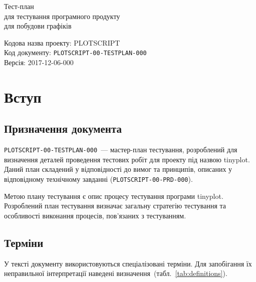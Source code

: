 \documentclass[a4paper,oneside,DIV=12,12pt]{scrartcl}
\newcommand{\progname}{tinyplot}
\newcommand{\theprojcode}{PLOTSCRIPT}
\newcommand{\theprojrev}{00}
\newcommand{\thedoctype}{TESTPLAN}
\newcommand{\thedocnum}{000}
\newcommand{\thedocfullcode}{\theprojcode-\theprojrev-\thedoctype-\thedocnum}
\newcommand{\printdocfullcode}{\texttt{\thedocfullcode}}
\newcommand{\theversion}{2017-12-06-000}
\newcommand{\theprdcode}{PLOTSCRIPT-00-PRD-000}
\newcommand{\printprdcode}{\texttt{\theprdcode}}
\begin{document}
	\begin{titlepage}
	\begin{center}
		\vspace*{\fill}
			Тест-план\\
			для тестування програмного продукту\\
			для побудови графіків
			
		\vspace*{\fill}
	\end{center}
	Кодова назва проекту: \theprojcode\\
	Код документу: \printdocfullcode\\
	Версія: \theversion\\
	\end{titlepage}
	
	\tableofcontents
	\newpage
	
	\section{Вступ}
	
		\subsection{Призначення документа}
			\printdocfullcode{~}— мастер-план тестування, розроблений для визначення деталей проведення тестових робіт для проекту під назвою \progname. Даний план складений у відповідності до вимог та принципів, описаних у відповідному технічному завданні (\printprdcode).
			
			Метою плану тестування є опис процесу тестування програми \progname. Розроблений план тестування визначає загальну стратегію тестування та особливості виконання процесів, пов'язаних з тестуванням.
			
		\subsection{Терміни}
			У тексті документу використовуються спеціалізовані терміни. Для запобігання їх неправильної інтерпретації наведені визначення~(табл.~\ref{tab:definitions}).
			
\end{document}
